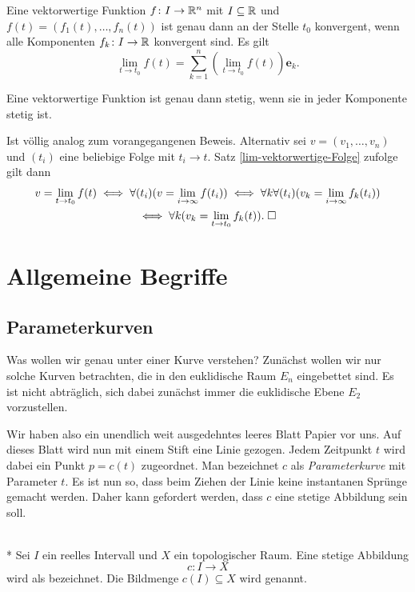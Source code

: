 \begin{theorem}\label{lim-vektorwertige-Funktion}
Eine vektorwertige Funktion $f\colon I\to\mathbb R^n$ mit $I\subseteq\mathbb R$ und
$f(t)=(f_1(t),\ldots,f_n(t))$ ist genau dann an der Stelle $t_0$
konvergent, wenn alle Komponenten $f_k\colon I\to\mathbb R$
konvergent sind. Es gilt%
\begin{equation}
\lim_{t\to t_0} f(t) = \sum_{k=1}^n (\lim_{t\to t_0}f(t))\mathbf e_k.
\end{equation}
\end{theorem}
\begin{corollary}
Eine vektorwertige Funktion ist genau dann stetig, wenn sie in
jeder Komponente stetig ist.
\end{corollary}
 Ist völlig analog zum vorangegangenen Beweis.
Alternativ sei $v=(v_1,\ldots,v_n)$ und $(t_i)$ eine beliebige Folge
mit $t_i\to t$. Satz \ref{lim-vektorwertige-Folge} zufolge gilt dann
\begin{gather}
v = \lim_{t\to t_0} f(t) \iff \forall (t_i)(v=\lim_{i\to\infty} f(t_i))
\iff \forall k\forall(t_i)(v_k = \lim_{i\to\infty} f_k(t_i))\\
\iff \forall k(v_k = \lim_{t\to t_0} f_k(t)).\;\Box
\end{gather}


\section{Allgemeine Begriffe}
\subsection{Parameterkurven}

Was wollen wir genau unter einer Kurve verstehen? Zunächst wollen
wir nur solche Kurven betrachten, die in den euklidische Raum $E_n$
eingebettet sind. Es ist nicht abträglich, sich dabei zunächst immer
die euklidische Ebene $E_2$ vorzustellen.

Wir haben also ein unendlich weit ausgedehntes leeres Blatt Papier
vor uns. Auf dieses Blatt wird nun mit einem Stift eine Linie gezogen.
Jedem Zeitpunkt $t$ wird dabei ein Punkt $p=c(t)$ zugeordnet.
Man bezeichnet $c$ als \emph{Parameterkurve} mit Parameter $t$.
Es ist nun so, dass beim Ziehen der Linie keine instantanen Sprünge
gemacht werden. Daher kann gefordert werden, dass $c$ eine
stetige Abbildung sein soll.

\begin{definition}\mbox{}\\*
Sei $I$ ein reelles Intervall und $X$ ein topologischer Raum.
Eine stetige Abbildung%
\begin{equation}
c\colon I\to X
\end{equation}
wird als  bezeichnet. Die Bildmenge
$c(I)\subseteq X$ wird  genannt.
\end{definition}

